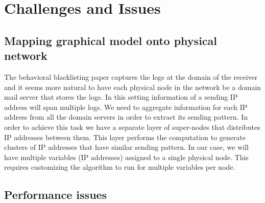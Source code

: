 \section{Challenges and Issues}
\label{ci} 
\subsection{Mapping graphical model onto physical network}
\label{map} 
The behavioral blacklisting paper \cite{bb} captures the logs at the domain of the receiver and it seems more natural to have each physical node in the network be a domain mail server that stores the logs. In this setting information of a sending IP address will span multiple logs. We need to aggregate information for each IP address from all the domain servers in order to extract its sending pattern. In order to achieve this task we have a separate layer of super-nodes that distributes IP addresses between them. This layer performs the computation to generate clusters of IP addresses that have similar sending pattern. In our case, we will have multiple variables (IP addresses) assigned to a single physical node. This requires customizing the algorithm to run for multiple variables per node.

\subsection{Performance issues}
\label{issues} 
